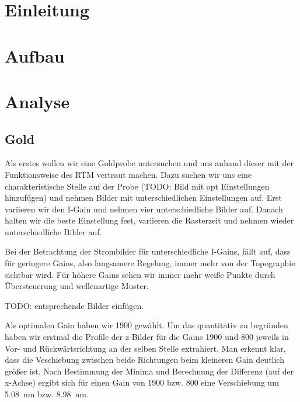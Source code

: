 \tableofcontents
\newpage
\listoffigures

\listoftables

\skippage

\setcounter{page}{1}
\restoregeometry
\thispagestyle{fancy}


\section{Einleitung}


\section{Aufbau}


\section{Analyse}
\subsection{Gold}

Als erstes wollen wir eine Goldprobe untersuchen und uns anhand dieser mit der Funktionsweise des RTM vertraut machen. Dazu suchen wir uns eine charakteristische Stelle auf der Probe (TODO: Bild mit opt Einstellungen hinzufügen) und nehmen Bilder mit unterschiedlichen Einstellungen auf. Erst variieren wir den I-Gain und nehmen vier unterschiedliche Bilder auf. Danach halten wir die beste Einstellung fest, variieren die Rasterzeit und nehmen wieder unterschiedliche Bilder auf.

Bei der Betrachtung der Strombilder für unterschiedliche I-Gains, fällt auf, dass für geringere Gains, also langsamere Regelung, immer mehr von der Topographie sichtbar wird. Für höhere Gains sehen wir immer mehr weiße Punkte durch Übersteuerung und wellenartige Muster.


TODO: entsprechende Bilder einfügen.


Als optimalen Gain haben wir 1900 gewählt. Um das quantitativ zu begründen haben wir erstmal die Profile der z-Bilder für die Gains 1900 und 800 jeweils in Vor- und Rückwärtsrichtung an der selben Stelle extrahiert. Man erkennt klar, dass die Veschiebung zwischen beide Richtungen beim kleineren Gain deutlich größer ist. Nach Bestimmung der Minima und Berechnung der Differenz (auf der x-Achse) ergibt sich für einen Gain von 1900 bzw. 800 eine Verschiebung um \SI{5,08}{nm} bzw. \SI{8,98}{nm}.

